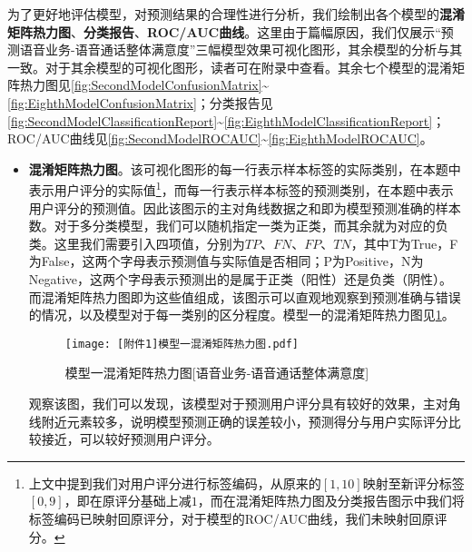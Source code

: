 \documentclass{MathorCupmodeling}
\begin{document}
	为了更好地评估模型，对预测结果的合理性进行分析，我们绘制出各个模型的\textbf{混淆矩阵热力图}、\textbf{分类报告}、\textbf{ROC/AUC曲线}。这里由于篇幅原因，我们仅展示“预测语音业务-语音通话整体满意度”三幅模型效果可视化图形，其余模型的分析与其一致。对于其余模型的可视化图形，读者可在附录中查看。其余七个模型的混淆矩阵热力图见\textcolor{blue}{\cref{fig:SecondModelConfusionMatrix}}\textasciitilde\textcolor{blue}{\cref{fig:EighthModelConfusionMatrix}}；分类报告见\textcolor{blue}{\cref{fig:SecondModelClassificationReport}}\textasciitilde\textcolor{blue}{\cref{fig:EighthModelClassificationReport}}；ROC/AUC曲线见\textcolor{blue}{\cref{fig:SecondModelROCAUC}}\textasciitilde\textcolor{blue}{\cref{fig:EighthModelROCAUC}}。
	\begin{itemize}
		\item \textbf{混淆矩阵热力图}。该可视化图形的每一行表示样本标签的实际类别，在本题中表示用户评分的实际值\textcolor{blue}{\footnote{上文中提到我们对用户评分进行标签编码，从原来的$\left[1,10\right]$映射至新评分标签$\left[0,9\right]$，即在原评分基础上减$1$，而在混淆矩阵热力图及分类报告图示中我们将标签编码已映射回原评分，对于模型的ROC/AUC曲线，我们未映射回原评分。}}，而每一行表示样本标签的预测类别，在本题中表示用户评分的预测值。因此该图示的主对角线数据之和即为模型预测准确的样本数。对于多分类模型，我们可以随机指定一类为正类，而其余就为对应的负类。这里我们需要引入四项值，分别为$TP$、$FN$、$FP$、$TN$，其中T为True，F为False，这两个字母表示预测值与实际值是否相同；P为Positive，N为Negative，这两个字母表示预测出的是属于正类（阳性）还是负类（阴性）。而混淆矩阵热力图即为这些值组成，该图示可以直观地观察到预测准确与错误的情况，以及模型对于每一类别的区分程度。模型一的混淆矩阵热力图见\textcolor{blue}{\cref{fig:FirstModelConfusionMatrix}}。
		\begin{figure}[H]
			\centerline{\texttt{[image: [附件1]模型一混淆矩阵热力图.pdf]}}
			\caption{模型一混淆矩阵热力图[语音业务-语音通话整体满意度]}\label{fig:FirstModelConfusionMatrix}
		\end{figure}

		观察该图，我们可以发现，该模型对于预测用户评分具有较好的效果，主对角线附近元素较多，说明模型预测正确的误差较小，预测得分与用户实际评分比较接近，可以较好预测用户评分。


\end{itemize}
\end{document}
